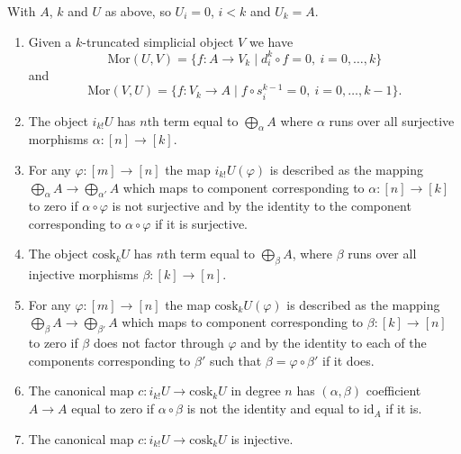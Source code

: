 \begin{lemma}
\label{lemma-eilenberg-maclane-object}
With $A$, $k$ and $U$ as above, so $U_i = 0$, $i < k$ and $U_k = A$.
\begin{enumerate}
\item Given a $k$-truncated simplicial object $V$
we have
$$
\text{Mor}(U, V)
=
\{ f : A \to V_k \mid d^k_i \circ f = 0, \ i = 0, \ldots, k \}
$$
and
$$
\text{Mor}(V, U)
=
\{ f : V_k \to A \mid f \circ s^{k - 1}_i = 0, \ i = 0, \ldots, k - 1 \}.
$$
\item The object $i_{k!} U$ has $n$th term equal to
$\bigoplus_\alpha A$ where $\alpha$ runs over all
surjective morphisms $\alpha : [n] \to [k]$.
\item For any $\varphi : [m] \to [n]$ the map
$i_{k!} U(\varphi)$ is described as the mapping
$\bigoplus_\alpha A \to \bigoplus_{\alpha'} A$
which maps to component corresponding to $\alpha : [n] \to [k]$
to zero if $\alpha \circ \varphi$ is not surjective and
by the identity to the component corresponding to
$\alpha \circ \varphi$ if it is surjective.
\item The object $\text{cosk}_k U$ has $n$th term equal to
$\bigoplus_\beta A$, where $\beta$ runs over all
injective morphisms $\beta : [k] \to [n]$.
\item For any $\varphi : [m] \to [n]$ the map
$\text{cosk}_k U(\varphi)$ is described as the mapping
$\bigoplus_\beta A \to \bigoplus_{\beta'} A$
which maps to component corresponding to $\beta : [k] \to [n]$
to zero if $\beta$ does not factor through $\varphi$ and
by the identity to each of the components corresponding to
$\beta'$ such that $\beta = \varphi \circ \beta'$
if it does.
\item The canonical map
$
c : i_{k !} U \to \text{cosk}_k U
$
in degree $n$ has $(\alpha, \beta)$ coefficient $A \to A$
equal to zero if $\alpha \circ \beta$ is not the identity
and equal to $\text{id}_A$ if it is.
\item The canonical map
$
c : i_{k !} U \to \text{cosk}_k U
$
is injective.
\end{enumerate}
\end{lemma}

